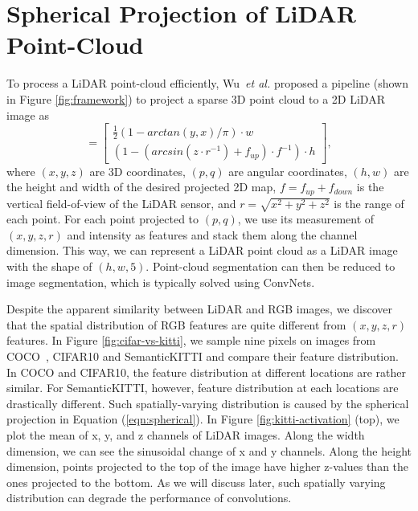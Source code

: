 \documentclass[runningheads]{llncs}
\begin{document}
\section{Spherical Projection of LiDAR Point-Cloud}
To process a LiDAR point-cloud efficiently, Wu~\textit{et al.} \cite{wu2017squeezeseg} proposed a pipeline (shown in Figure \ref{fig:framework}) to project a sparse 3D point cloud to a 2D LiDAR image as
\begin{equation}
[\begin{array}{c}
     p \\
     q
\end{array}] = [\begin{array}{c}
    \frac{1}{2}(1 - arctan(y,x) / \pi) \cdot w\\
    (1 - (arcsin(z\cdot r^{-1})+f_{up})\cdot f^{-1}) \cdot h
\end{array}],
\label{eqn:spherical}
\end{equation}
where $(x, y, z)$ are 3D coordinates, $(p, q)$ are angular coordinates, $(h, w)$ are the height and width of the desired projected 2D map, $f = f_{up} + f_{down}$ is the vertical field-of-view of the LiDAR sensor, and $r =\sqrt{x^2+y^2+z^2} $ is the range of each point. For each point projected to $(p, q)$, we use its measurement of $(x, y, z, r)$ and intensity as features and stack them along the channel dimension. This way, we can represent a LiDAR point cloud as a LiDAR image with the shape of $(h, w, 5)$. Point-cloud segmentation can then be reduced to image segmentation, which is typically solved using ConvNets.  


Despite the apparent similarity between LiDAR and RGB images, we discover that the spatial distribution of RGB features are quite different from $(x, y, z, r)$ features. In Figure \ref{fig:cifar-vs-kitti}, we sample nine pixels on images from COCO~\cite{lin2014microsoft}, CIFAR10 \cite{krizhevsky2009learning} and SemanticKITTI \cite{behley2019iccv} and compare their feature distribution. In COCO and CIFAR10, the feature distribution at different locations are rather similar. For SemanticKITTI, however, feature distribution at each locations are drastically different. Such spatially-varying distribution is caused by the spherical projection in Equation (\ref{eqn:spherical}). In Figure \ref{fig:kitti-activation} (top), we plot the mean of x, y, and z channels of LiDAR images. Along the width dimension, we can see the sinusoidal change of x and y channels. Along the height dimension, points projected to the top of the image have higher z-values than the ones projected to the bottom. As we will discuss later, such spatially varying distribution can degrade the performance of convolutions. 
\end{document}
